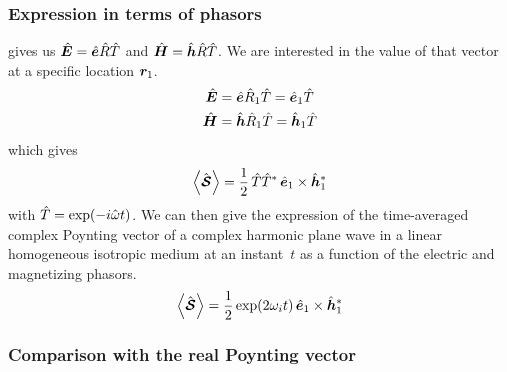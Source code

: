 
\subsubsection{Expression in terms of phasors}

 gives us $\hat{\bm{E}} = \hat{\bm{e}} \hat{R} \hat{T}$
and $\hat{\bm{H}} = \hat{\bm{h}} \hat{R} \hat{T}$.
We are interested in the value of that vector at a specific location $\bm{r}_1$.
\begin{align}
    \hat{\bm{E}} &= \hat{\bm{e}} \hat{R}_1 \hat{T} = \hat{\bm{e}}_1 \hat{T} \\
    \hat{\bm{H}} &= \hat{\bm{h}} \hat{R}_1 \hat{T} = \hat{\bm{h}}_1 \hat{T}
\end{align}
which gives
\begin{equation}
    \Timeavg{\vectcp{\power{S}}} =
    \frac{1}{2}
    \,
    \cp{T}\cp{T}^*
    \,
    \vectcp{e}_1 \times \vectcp{h}_1^*
\end{equation}
with $\cp{T} = \exp\left(-i \cp{\omega} t \right)$.
We can then give the expression of the time-averaged complex Poynting vector of a complex harmonic plane wave in a linear homogeneous isotropic medium at an instant~$t$ as a function of the electric and magnetizing phasors.
\begin{equation}
    \Timeavg{\vectcp{\power{S}}}
    =
    \frac{1}{2}
    \exp(2\omega_\im t)
    \,
    \vectcp{e}_1 \times \vectcp{h}_1^*
    \label{eq:time_avg_cplx_poynting_phasors}
\end{equation}



\subsubsection{Comparison with the real Poynting vector}

